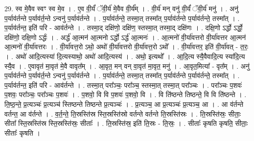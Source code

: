 \documentclass[17pt]{extarticle}
\begin{document}
29. स्व मे॒वैव स्वꣳ स्व मे॒व । . ए॒व वी॒र्यं॑ ॅवी॒र्य॑ मे॒वैव वी॒र्य᳚म् । . वी॒र्य॑ मन् वनु॑ वी॒र्यं॑ ॅवी॒र्य॑ मनु॑ । . अनु॑ प॒र्याव॑र्तन्ते प॒र्याव॑र्त॒न्ते ऽन्वनु॑ प॒र्याव॑र्तन्ते । . प॒र्याव॑र्तन्ते॒ तस्मा॒त् तस्मा᳚त् प॒र्याव॑र्तन्ते प॒र्याव॑र्तन्ते॒ तस्मा᳚त् । . प॒र्याव॑र्तन्त॒ इति॑ परि - आव॑र्तन्ते । . तस्मा॒द् दक्षि॑णो॒ दक्षि॑ण॒ स्तस्मा॒त् तस्मा॒द् दक्षि॑णः । . दक्षि॒णो ऽर्द्धो ऽर्द्धो॒ दक्षि॑णो॒ दक्षि॒णो ऽर्द्धः॑ । . अर्द्ध॑ आ॒त्मन॑ आ॒त्मनो ऽर्द्धो ऽर्द्ध॑ आ॒त्मनः॑ । . आ॒त्मनो॑ वी॒र्या॑वत्तरो वी॒र्या॑वत्तर आ॒त्मन॑ आ॒त्मनो॑ वी॒र्या॑वत्तरः । . वी॒र्या॑वत्त॒रो ऽथो॒ अथो॑ वी॒र्या॑वत्तरो वी॒र्या॑वत्त॒रो ऽथो᳚ । . वी॒र्या॑वत्तर॒ इति॑ वी॒र्या॑वत् - त॒रः॒ । . अथो॑ आदि॒त्यस्या॑ दि॒त्यस्याथो॒ अथो॑ आदि॒त्यस्य॑ । . अथो॒ इत्यथो᳚ । . आ॒दि॒त्य स्यै॒वैवादि॒त्य स्या॑दि॒त्य स्यै॒व । . ए॒वावृत॑ मा॒वृत॑ मे॒वै वावृत᳚म् । . आ॒वृत॒ मन् वन् वा॒वृत॑ मा॒वृत॒ मनु॑ । . आ॒वृत॒मित्या᳚ - वृत᳚म् । . अनु॑ प॒र्याव॑र्तन्ते प॒र्याव॑र्त॒न्ते ऽन्वनु॑ प॒र्याव॑र्तन्ते । . प॒र्याव॑र्तन्ते॒ तस्मा॒त् तस्मा᳚त् प॒र्याव॑र्तन्ते प॒र्याव॑र्तन्ते॒ तस्मा᳚त् । . प॒र्याव॑र्तन्त॒ इति॑ परि - आव॑र्तन्ते । . तस्मा॒त् परा᳚ञ्चः॒ परा᳚ञ्च॒ स्तस्मा॒त् तस्मा॒त् परा᳚ञ्चः । . परा᳚ञ्चः प॒शवः॑ प॒शवः॒ परा᳚ञ्चः॒ परा᳚ञ्चः प॒शवः॑ । . प॒शवो॒ वि वि प॒शवः॑ प॒शवो॒ वि । . वि ति॑ष्ठन्ते तिष्ठन्ते॒ वि वि ति॑ष्ठन्ते । . ति॒ष्ठ॒न्ते॒ प्र॒त्यञ्चः॑ प्र॒त्यञ्च॑ स्तिष्ठन्ते तिष्ठन्ते प्र॒त्यञ्चः॑ । . प्र॒त्यञ्च॒ आ प्र॒त्यञ्चः॑ प्र॒त्यञ्च॒ आ । . आ व॑र्तन्ते वर्तन्त॒ आ व॑र्तन्ते । . व॒र्त॒न्ते॒ ति॒स्रस्ति॑स्र स्ति॒स्रस्ति॑स्रो वर्तन्ते वर्तन्ते ति॒स्रस्ति॑स्रः । . ति॒स्रस्ति॑स्रः॒ सीताः॒ सीता᳚ स्ति॒स्रस्ति॑स्र स्ति॒स्रस्ति॑स्रः॒ सीताः᳚ । . ति॒स्रस्ति॑स्र॒ इति॑ ति॒स्रः - ति॒स्रः॒ । . सीताः᳚ कृषति कृषति॒ सीताः॒ सीताः᳚ कृषति । \newline
\end{document}
